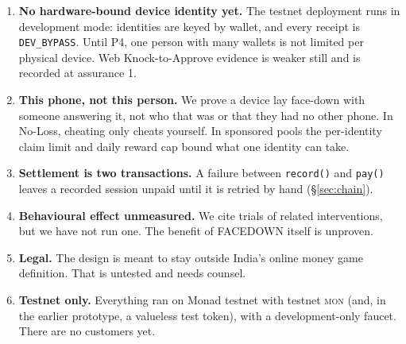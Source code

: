 \documentclass[10pt]{article}
\newcommand{\code}[1]{\texttt{\small #1}}
\newcommand{\mon}{\textsc{mon}}
\begin{document}
\begin{enumerate}
\item \textbf{No hardware-bound device identity yet.} The testnet deployment runs in development mode: identities are
keyed by wallet, and every receipt is \code{DEV\_BYPASS}. Until P4, one person with many wallets is not limited per
physical device. Web Knock-to-Approve evidence is weaker still and is recorded at assurance 1.
\item \textbf{This phone, not this person.} We prove a device lay face-down with someone answering it, not who that was or
that they had no other phone. In No-Loss, cheating only cheats yourself. In sponsored pools the per-identity claim limit
and daily reward cap bound what one identity can take.
\item \textbf{Settlement is two transactions.} A failure between \code{record()} and \code{pay()} leaves a recorded session
unpaid until it is retried by hand (\S\ref{sec:chain}).
\item \textbf{Behavioural effect unmeasured.} We cite trials of related interventions, but we have not run one. The
benefit of FACEDOWN itself is unproven.
\item \textbf{Legal.} The design is meant to stay outside India's online money game definition. That is untested and
needs counsel.
\item \textbf{Testnet only.} Everything ran on Monad testnet with testnet \mon{} (and, in the earlier prototype, a
valueless test token), with a development-only faucet. There are no customers yet.
\end{enumerate}
\end{document}
